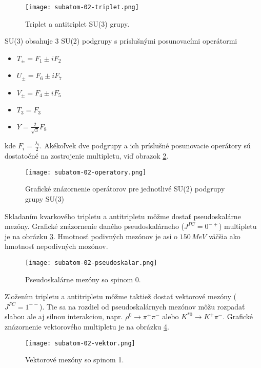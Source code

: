 \documentclass[../../main.tex]{subfiles}
\begin{document}
\begin{figure}[!h]
\texttt{[image: subatom-02-triplet.png]}
\centering
\caption{Triplet a antitriplet SU(3) grupy.}
\label{sf2:fig:triplet}
\end{figure}

SU(3) obsahuje 3 SU(2) podgrupy s príslušnými posunovacími operátormi 
\begin{itemize}
\item $T_{\pm} = F_1 \pm iF_{2}$
\item $U_{\pm} = F_6 \pm iF_{7}$
\item $V_{\pm} = F_4 \pm iF_{5}$
\item $T_3 = F_3$
\item $Y = \frac{2}{\sqrt{3}}F_8$
\end{itemize}
kde $F_i = \frac{\lambda_i}{2}$. Akékoľvek dve podgrupy a ich príslušné posunovacie operátory sú dostatočné na zostrojenie multipletu, viď obrazok \ref{sf2:fig:operatory}. 

\begin{figure}[!h]
\texttt{[image: subatom-02-operatory.png]}
\centering
\caption{Grafické znázornenie operátorov pre jednotlivé SU(2) podgrupy grupy SU(3)}
\label{sf2:fig:operatory}
\end{figure}

Skladaním kvarkového tripletu a antitripletu môžme dostať pseudoskalárne mezóny. 
Grafické znázornenie daného pseudoskalárneho ($J^{PC}=0^{-+}$) multipletu je na obrázku \ref{sf2:fig:pseudoskalar}. Hmotnosť podivných mezónov je asi o $150\,\unit{MeV}$ väčšia ako hmotnosť nepodivných mozónov.

\begin{figure}[!h]
\texttt{[image: subatom-02-pseudoskalar.png]}
\centering
\caption{Pseudoskalárne mezóny so spinom 0.}
\label{sf2:fig:pseudoskalar}
\end{figure}

Zložením tripletu a antitripletu môžme taktiež dostať vektorové mezóny ($J^{PC}=1^{--}$). Tie sa na rozdiel od pseudoskalárnych mezónov môžu rozpadať slabou ale aj silnou interakciou, napr. $\rho^0 \rightarrow \pi^{+}\pi^{-}$ alebo $K^{*0} \rightarrow K^{+}\pi^{-}$. Grafické znázornenie vektorového multipletu je na obrázku \ref{sf2:fig:vektor}.

\begin{figure}[!h]
\texttt{[image: subatom-02-vektor.png]}
\centering
\caption{Vektorové mezóny so spinom 1.}
\label{sf2:fig:vektor}
\end{figure}
\end{document}
